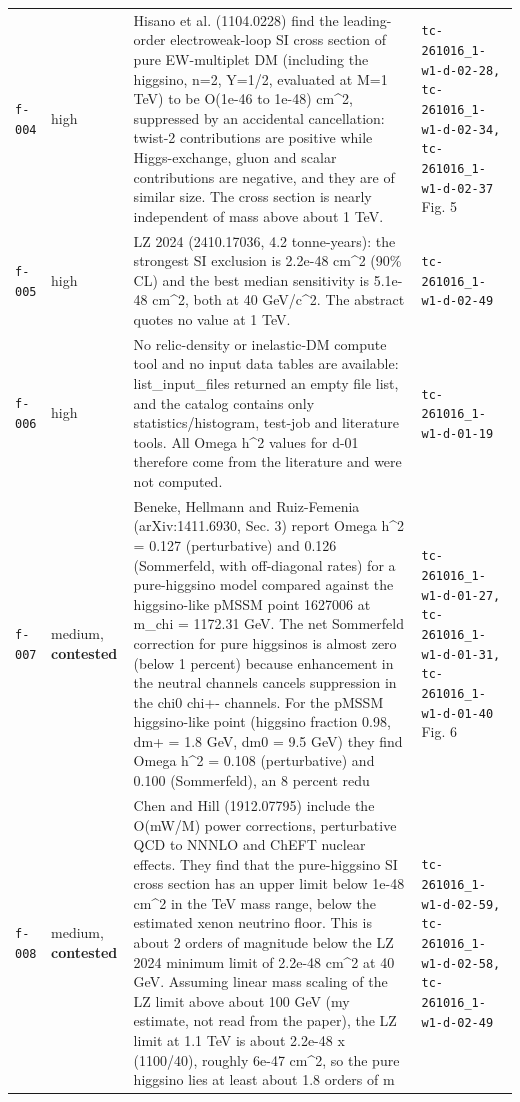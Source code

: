 \documentclass[11pt,a4paper]{article}
\begin{document}
\begin{longtable}{@{}p{}p{}p{}p{}@{}}
\texttt{f-004} & high & Hisano et al. (1104.0228) find the leading-order electroweak-loop SI cross section of pure EW-multiplet DM (including the higgsino, n=2, Y=1/2, evaluated at M=1 TeV) to be O(1e-46 to 1e-48) cm\textasciicircum{}2, suppressed by an accidental cancellation: twist-2 contributions are positive while Higgs-exchange, gluon and scalar contributions are negative, and they are of similar size. The cross section is nearly independent of mass above about 1 TeV. & \texttt{tc-261016\_\allowbreak{}1-w1-d-02-28,\allowbreak{} tc-261016\_\allowbreak{}1-w1-d-02-34,\allowbreak{} tc-261016\_\allowbreak{}1-w1-d-02-37} Fig. 5 \\
\texttt{f-005} & high & LZ 2024 (2410.17036, 4.2 tonne-years): the strongest SI exclusion is 2.2e-48 cm\textasciicircum{}2 (90\% CL) and the best median sensitivity is 5.1e-48 cm\textasciicircum{}2, both at 40 GeV/c\textasciicircum{}2. The abstract quotes no value at 1 TeV. & \texttt{tc-261016\_\allowbreak{}1-w1-d-02-49} \\
\texttt{f-006} & high & No relic-density or inelastic-DM compute tool and no input data tables are available: list\_input\_files returned an empty file list, and the catalog contains only statistics/histogram, test-job and literature tools. All Omega h\textasciicircum{}2 values for d-01 therefore come from the literature and were not computed. & \texttt{tc-261016\_\allowbreak{}1-w1-d-01-19} \\
\texttt{f-007} & medium, \textbf{contested} & Beneke, Hellmann and Ruiz-Femenia (arXiv:1411.6930, Sec. 3) report Omega h\textasciicircum{}2 = 0.127 (perturbative) and 0.126 (Sommerfeld, with off-diagonal rates) for a pure-higgsino model compared against the higgsino-like pMSSM point 1627006 at m\_chi = 1172.31 GeV. The net Sommerfeld correction for pure higgsinos is almost zero (below 1 percent) because enhancement in the neutral channels cancels suppression in the chi0 chi+- channels. For the pMSSM higgsino-like point (higgsino fraction 0.98, dm+ = 1.8 GeV, dm0 = 9.5 GeV) they find Omega h\textasciicircum{}2 = 0.108 (perturbative) and 0.100 (Sommerfeld), an 8 percent redu & \texttt{tc-261016\_\allowbreak{}1-w1-d-01-27,\allowbreak{} tc-261016\_\allowbreak{}1-w1-d-01-31,\allowbreak{} tc-261016\_\allowbreak{}1-w1-d-01-40} Fig. 6 \\
\texttt{f-008} & medium, \textbf{contested} & Chen and Hill (1912.07795) include the O(mW/M) power corrections, perturbative QCD to NNNLO and ChEFT nuclear effects. They find that the pure-higgsino SI cross section has an upper limit below 1e-48 cm\textasciicircum{}2 in the TeV mass range, below the estimated xenon neutrino floor. This is about 2 orders of magnitude below the LZ 2024 minimum limit of 2.2e-48 cm\textasciicircum{}2 at 40 GeV. Assuming linear mass scaling of the LZ limit above about 100 GeV (my estimate, not read from the paper), the LZ limit at 1.1 TeV is about 2.2e-48 x (1100/40), roughly 6e-47 cm\textasciicircum{}2, so the pure higgsino lies at least about 1.8 orders of m & \texttt{tc-261016\_\allowbreak{}1-w1-d-02-59,\allowbreak{} tc-261016\_\allowbreak{}1-w1-d-02-58,\allowbreak{} tc-261016\_\allowbreak{}1-w1-d-02-49} \\

\end{longtable}
\end{document}
